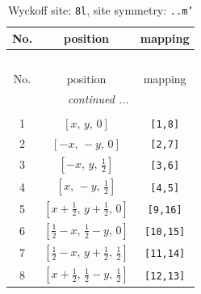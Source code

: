 \documentclass[fleqn,8pt]{jsarticle}
\begin{document}
\begin{longtable}{ccc}
\caption{Wyckoff site: {\tt 8l}, site symmetry: {\tt ..m'}}
 \\
 \hline \hline
No. & position & mapping \\ \hline \endfirsthead

\multicolumn{2}{l}{\tablename\ \thetable{}} \\
 \hline \hline
No. & position & mapping \\ \hline \endhead

 \hline \hline
\multicolumn{2}{r}{\footnotesize\it continued ...} \\ \endfoot

 \hline \hline
\multicolumn{2}{r}{} \\ \endlastfoot

1 & $\left[ x,\, y,\, 0 \right]$ & {\tt [1,8]} \\ \hline
2 & $\left[ - x,\, - y,\, 0 \right]$ & {\tt [2,7]} \\ \hline
3 & $\left[ - x,\, y,\, \frac{1}{2} \right]$ & {\tt [3,6]} \\ \hline
4 & $\left[ x,\, - y,\, \frac{1}{2} \right]$ & {\tt [4,5]} \\ \hline
5 & $\left[ x + \frac{1}{2},\, y + \frac{1}{2},\, 0 \right]$ & {\tt [9,16]} \\ \hline
6 & $\left[ \frac{1}{2} - x,\, \frac{1}{2} - y,\, 0 \right]$ & {\tt [10,15]} \\ \hline
7 & $\left[ \frac{1}{2} - x,\, y + \frac{1}{2},\, \frac{1}{2} \right]$ & {\tt [11,14]} \\ \hline
8 & $\left[ x + \frac{1}{2},\, \frac{1}{2} - y,\, \frac{1}{2} \right]$ & {\tt [12,13]} \\
\end{longtable}
\renewcommand{\arraystretch}{1.2}
\end{document}
